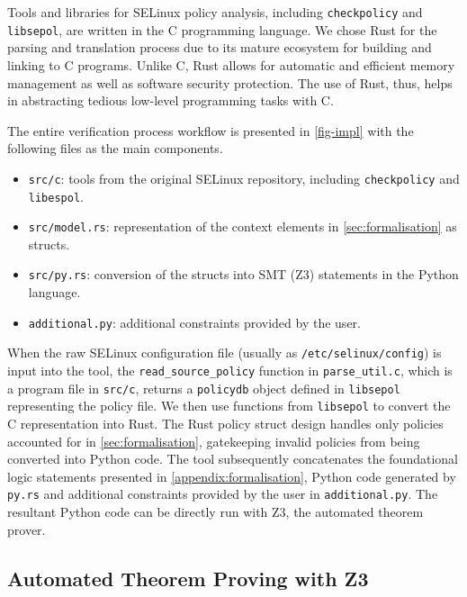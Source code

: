\documentclass[acmsmall,screen,nonacm]{acmart}
\begin{document}
Tools and libraries for SELinux policy analysis, including \texttt{checkpolicy} 
and \texttt{libsepol}, are written in the C programming language. We chose Rust 
for the parsing and translation process due to its mature ecosystem for 
building and linking to C programs. Unlike C, Rust allows for automatic and 
efficient memory management as well as software security protection. The use of 
Rust, thus, helps in abstracting tedious low-level programming tasks with C. 
\cite{rustC}

The entire verification process workflow is presented in \autoref{fig-impl} 
with the following files as the main components.
\begin{itemize}
    \item \texttt{src/c}: tools from the original SELinux repository, including 
\texttt{checkpolicy} and \texttt{libespol}.
    \item \texttt{src/model.rs}: representation of the context elements in 
\autoref{sec:formalisation} as structs.
    \item \texttt{src/py.rs}: conversion of the structs into SMT (Z3) 
statements in the Python language.
    \item \texttt{additional.py}: additional constraints provided by the user.
\end{itemize}



When the raw SELinux configuration file (usually as 
\texttt{/etc/selinux/config}) is input into the tool, the 
\texttt{read\_source\_policy} function in \texttt{parse\_util.c}, which is a 
program file in \texttt{src/c}, returns a \texttt{policydb} object defined in 
\texttt{libsepol} representing the policy file. We then use functions from 
\texttt{libsepol} to convert the C representation into Rust. The Rust policy 
struct design handles only policies accounted for in 
\autoref{sec:formalisation}, gatekeeping invalid policies from being converted 
into Python code. The tool subsequently concatenates the foundational logic 
statements presented in \autoref{appendix:formalisation}, Python code generated 
by \texttt{py.rs} and additional constraints provided by the user in 
\texttt{additional.py}. The resultant Python code can be directly run with Z3, 
the automated theorem prover.

\subsection{Automated Theorem Proving with Z3}
\end{document}
